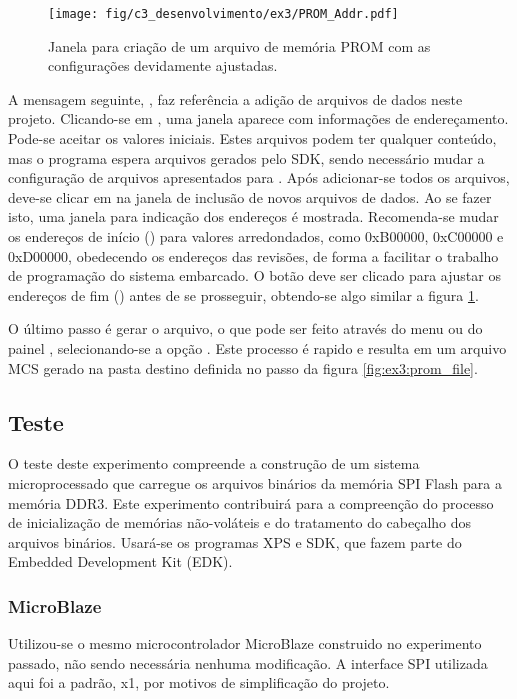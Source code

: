 \documentclass[11pt,a4paper,oneside]{book}
\begin{document}
\begin{figure}[htp]
\centering
\texttt{[image: fig/c3\_desenvolvimento/ex3/PROM\_Addr.pdf]}
\caption{Janela para criação de um arquivo de memória PROM com as configurações devidamente ajustadas.}
\label{fig:ex3:prom_addr}
\end{figure}

A mensagem seguinte, , faz referência a adição de arquivos de dados neste projeto.
Clicando-se em , uma janela aparece com informações de endereçamento.
Pode-se aceitar os valores iniciais.
Estes arquivos podem ter qualquer conteúdo, mas o programa espera arquivos gerados pelo SDK, sendo necessário mudar a configuração de arquivos apresentados para .
Após adicionar-se todos os arquivos, deve-se clicar em  na janela de inclusão de novos arquivos de dados.
Ao se fazer isto, uma janela para indicação dos endereços é mostrada.
Recomenda-se mudar os endereços de início () para valores arredondados, como 0xB00000, 0xC00000 e 0xD00000, obedecendo os endereços das revisões, de forma a facilitar o trabalho de programação do sistema embarcado.
O botão  deve ser clicado para ajustar os endereços de fim () antes de se prosseguir, obtendo-se algo similar a figura \ref{fig:ex3:prom_addr}.

O último passo é gerar o arquivo, o que pode ser feito através do menu  ou do painel , selecionando-se a opção .
Este processo é rapido e resulta em um arquivo MCS gerado na pasta destino definida no passo da figura \ref{fig:ex3:prom_file}.

\subsection{Teste}
O teste deste experimento compreende a construção de um sistema microprocessado que carregue os arquivos binários da memória SPI Flash para a memória DDR3.
Este experimento contribuirá para a compreenção do processo de inicialização de memórias não-voláteis e do tratamento do cabeçalho dos arquivos binários.
Usará-se os programas XPS e SDK, que fazem parte do Embedded Development Kit (EDK).

\subsubsection{MicroBlaze}
Utilizou-se o mesmo microcontrolador MicroBlaze construido no experimento passado, não sendo necessária nenhuma modificação.
A interface SPI utilizada aqui foi a padrão, x1, por motivos de simplificação do projeto.
\end{document}
